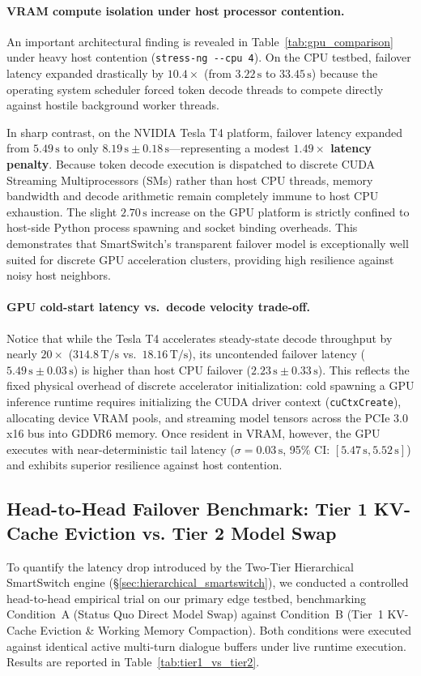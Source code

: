 \documentclass[11pt,a4paper]{article}
\newcommand{\Ts}{\,\mathrm{T/s}}
\newcommand{\su}{\,\mathrm{s}}
\newcommand{\code}[1]{\texttt{#1}}
\begin{document}
\paragraph{VRAM compute isolation under host processor contention.}
An important architectural finding is revealed in Table~\ref{tab:gpu_comparison} under heavy host contention (\code{stress-ng -{}-cpu 4}). On the CPU testbed, failover latency expanded drastically by $10.4\times$ (from $3.22\su$ to $33.45\su$) because the operating system scheduler forced token decode threads to compete directly against hostile background worker threads. 

In sharp contrast, on the NVIDIA Tesla T4 platform, failover latency expanded from $5.49\su$ to only \textbf{$8.19\su \pm 0.18\su$}---representing a modest \textbf{$1.49\times$ latency penalty}. Because token decode execution is dispatched to discrete CUDA Streaming Multiprocessors (SMs) rather than host CPU threads, memory bandwidth and decode arithmetic remain completely immune to host CPU exhaustion. The slight $2.70\su$ increase on the GPU platform is strictly confined to host-side Python process spawning and socket binding overheads. This demonstrates that SmartSwitch's transparent failover model is exceptionally well suited for discrete GPU acceleration clusters, providing high resilience against noisy host neighbors.

\paragraph{GPU cold-start latency vs.\ decode velocity trade-off.}
Notice that while the Tesla T4 accelerates steady-state decode throughput by nearly $20\times$ ($314.8\Ts$ vs.\ $18.16\Ts$), its uncontended failover latency ($5.49\su \pm 0.03\su$) is higher than host CPU failover ($2.23\su \pm 0.33\su$). This reflects the fixed physical overhead of discrete accelerator initialization: cold spawning a GPU inference runtime requires initializing the CUDA driver context (\code{cuCtxCreate}), allocating device VRAM pools, and streaming model tensors across the PCIe 3.0 x16 bus into GDDR6 memory. Once resident in VRAM, however, the GPU executes with near-deterministic tail latency ($\sigma = 0.03\su$, 95\% CI: $[5.47\su, 5.52\su]$) and exhibits superior resilience against host contention.

\subsection{Head-to-Head Failover Benchmark: Tier 1 KV-Cache Eviction vs. Tier 2 Model Swap}\label{sec:tier1_vs_tier2_eval}
To quantify the latency drop introduced by the Two-Tier Hierarchical SmartSwitch engine (\S\ref{sec:hierarchical_smartswitch}), we conducted a controlled head-to-head empirical trial on our primary edge testbed, benchmarking Condition~A (Status Quo Direct Model Swap) against Condition~B (Tier~1 KV-Cache Eviction \& Working Memory Compaction). Both conditions were executed against identical active multi-turn dialogue buffers under live runtime execution. Results are reported in Table~\ref{tab:tier1_vs_tier2}.
\end{document}
